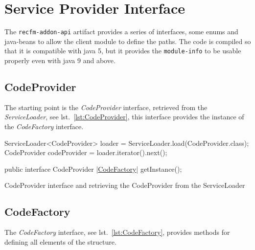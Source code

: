 %                                           

\chapter{Service Provider Interface}
The \verb!recfm-addon-api! artifact provides a series of interfaces, some enums 
and java-beans to allow the client module to define the paths. 
The code is compiled so that it is compatible with java 5, but it provides the 
\verb!module-info! to be usable properly even with java 9 and above.

\section{CodeProvider}
The starting point is the \textsl{CodeProvider} interface, retrieved from the 
\textsl{ServiceLoader}, see lst.~\ref{lst:CodeProvider}, this interface
provides the instance of the \textsl{CodeFactory} interface.

\begin{elisting}[!htb]
\begin{javacode}
      ServiceLoader<CodeProvider> loader = ServiceLoader.load(CodeProvider.class);
      CodeProvider codeProvider = loader.iterator().next();
\end{javacode}
\vspace*{-1cm}
\begin{javacode}
public interface CodeProvider {
     |\hyperref[lst:CodeFactory]{CodeFactory}| getInstance();
}
\end{javacode}
\caption{CodeProvider interface and retrieving the CodeProvider from the ServiceLoader}
\label{lst:CodeProvider}
\end{elisting}


\section{CodeFactory}
The \textsl{CodeFactory} interface, see lst.~\ref{lst:CodeFactory}, provides 
methods for defining all elements of the structure.

